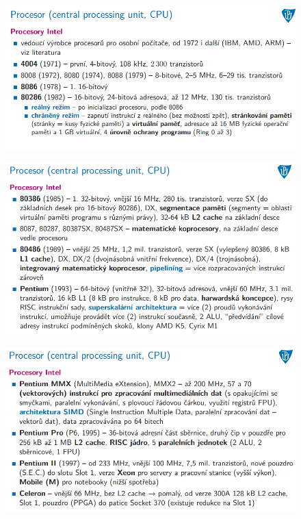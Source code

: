 \documentclass[10pt,a4paper]{article}
\begin{document}
\begin{figure} [h]
	\includegraphics[scale=0.65]{img/prvni_odstavec/otazka5/procesor6.png}	
\end{figure}

\begin{figure} [h]
	\includegraphics[scale=0.65]{img/prvni_odstavec/otazka5/procesor7.png}	
\end{figure}

\begin{figure} [h]
	\includegraphics[scale=0.65]{img/prvni_odstavec/otazka5/procesor8.png}	
\end{figure}
\end{document}

